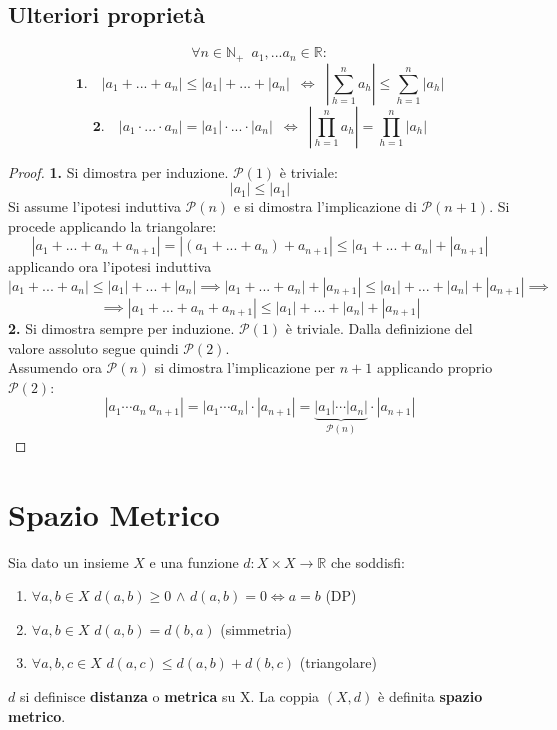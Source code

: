 \documentclass[10pt, oneside]{book}
\theoremstyle{plain}
\begin{document}
\subsection*{Ulteriori proprietà}
\begin{prop}
    \[\forall n \in \mathbb{N}_+ \enspace a_1, ... a_n \in \mathbb{R} :\]
        \[\mathbf{1.} \quad |a_1 + ... + a_n| \leq |a_1| + ... + |a_n| \enspace \Leftrightarrow \enspace |\sum \limits_{h=1}^n a_h| \leq \sum \limits_{h=1}^n |a_h|\]
        \[\mathbf{2.} \quad |a_1 \cdot ... \cdot a_n| = |a_1| \cdot ... \cdot |a_n| \enspace \Leftrightarrow \enspace |\prod \limits_{h=1}^n a_h| = \prod \limits_{h=1}^n |a_h|\]
\end{prop}
\begin{proof}
\textbf{1.} Si dimostra per induzione. $\mathcal{P}(1)$ è triviale:
\[|a_1| \leq |a_1|\]
Si assume l'ipotesi induttiva $\mathcal{P}(n)$ e si dimostra l'implicazione di $\mathcal{P}(n+1)$. Si procede applicando la triangolare:
\[|a_1 + ... + a_n + a_{n+1}| = |(a_1 + ... + a_n) + a_{n+1}| \leq |a_1 + ... + a_n| + |a_{n+1}|\]
applicando ora l'ipotesi induttiva
\[|a_1 + ... + a_n| \leq |a_1| + ... + |a_n| \implies |a_1 + ... + a_n| + |a_{n+1}| \leq |a_1| + ... + |a_n| + |a_{n+1}| \implies\]
\[\implies |a_1 + ... + a_n + a_{n+1}| \leq |a_1| + ... + |a_n| + |a_{n+1}|\]
\textbf{2.} Si dimostra sempre per induzione. $\mathcal{P}(1)$ è triviale. Dalla definizione del valore assoluto segue quindi $\mathcal{P}(2)$.\\
Assumendo ora $\mathcal{P}(n)$ si dimostra l'implicazione per $n+1$ applicando proprio $\mathcal{P}(2)$:
\[|a_1 \cdots a_n \, a_{n+1}| = |a_1 \cdots a_n| \cdot |a_{n+1}| = \underbrace{|a_1| \cdots |a_n|}_{\mathcal{P}(n)} \cdot |a_{n+1}|\]
\end{proof}

\section{Spazio Metrico}
\begin{defin}
    Sia dato un insieme $X$ e una funzione $d : X \times X \rightarrow \mathbb{R}$ che soddisfi:
    \begin{enumerate}
        \item $\forall a,b \in X$ $d(a,b) \geq 0$ $\land$ $d(a,b) = 0 \Leftrightarrow a = b$ (DP)
        \item $\forall a,b \in X$ $d(a,b) = d(b,a)$ (simmetria)
        \item$\forall a,b,c \in X$ $d(a,c) \leq d(a,b) + d(b,c)$ (triangolare)
    \end{enumerate}
    $d$ si definisce \textbf{distanza} o \textbf{metrica} su X. La coppia $(X,d)$ è definita \textbf{spazio metrico}.
\end{defin}
\newpage
\end{document}
